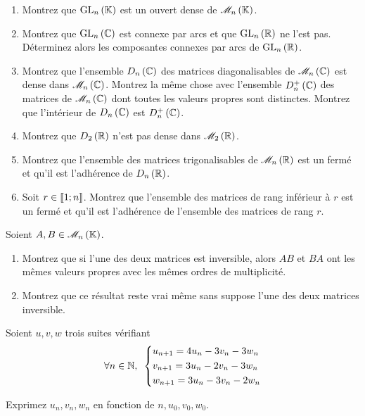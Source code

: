 \begin{exoss}[Exercice 28]
\begin{enumerate}
    \item Montrez que \(\GL{n}\) est un ouvert dense de \(\M{n}\). \\
    \item Montrez que \(\GL{n}[\C]\) est connexe par arcs et que \(\GL{n}[\R]\) ne l'est pas. Déterminez alors les composantes connexes par arcs de \(\GL{n}[\R]\). \\
    \item Montrez que l'ensemble \(D_n\left(\mathbb{C}\right)\) des matrices diagonalisables de \(\M{n}[\C]\) est dense dans \(\M{n}[\C]\). Montrez la même chose avec l'ensemble \(D_n^+\left(\mathbb{C}\right)\) des matrices de \(\M{n}[\C]\) dont toutes les valeurs propres sont distinctes. Montrez que l'intérieur de \(D_n\left(\mathbb{C}\right)\) est \(D_n^+\left(\mathbb{C}\right)\). \\
    \item Montrez que \(D_2\left(\mathbb{R}\right)\) n'est pas dense dans \(\M{2}[\R]\). \\
    \item Montrez que l'ensemble des matrices trigonalisables de \(\M{n}[\R]\) est un fermé et qu'il est l'adhérence de \(D_n\left(\mathbb{R}\right)\). \\
    \item Soit \(r\in\left\llbracket1;n\right\rrbracket\). Montrez que l'ensemble des matrices de rang inférieur à \(r\) est un fermé et qu'il est l'adhérence de l'ensemble des matrices de rang \(r\).
\end{enumerate}
\end{exoss}



\begin{exosss}[Exercice 29]
Soient \(A,B\in\M{n}\).

\begin{enumerate}
    \item Montrez que si l'une des deux matrices est inversible, alors \(AB\) et \(BA\) ont les mêmes valeurs propres avec les mêmes ordres de multiplicité. \\
    \item Montrez que ce résultat reste vrai même sans suppose l'une des deux matrices inversible.
\end{enumerate}
\end{exosss}



\begin{exo}
Soient \(u,v,w\) trois suites vérifiant \[\quantifs{\forall n\in\N}\begin{dcases}
u_{n+1}=4u_n-3v_n-3w_n \\
v_{n+1}=3u_n-2v_n-3w_n \\
w_{n+1}=3u_n-3v_n-2w_n
\end{dcases}\]

Exprimez \(u_n,v_n,w_n\) en fonction de \(n,u_0,v_0,w_0\).
\end{exo}



